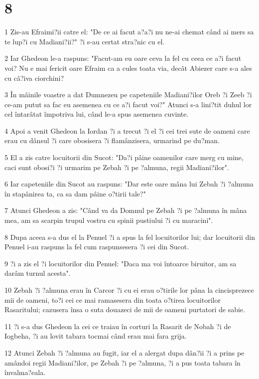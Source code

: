 \chapter{8}

\par 1 Zis-au Efraimi?ii catre el: "De ce ai facut a?a?i nu ne-ai chemat când ai mers sa te lup?i cu Madiani?ii?" ?i s-au certat stra?nic cu el.
\par 2 Iar Ghedeon le-a raspuns: "Facut-am eu oare ceva la fel cu ceea ce a?i facut voi? Nu e mai fericit oare Efraim ca a cules toata via, decât Abiezer care s-a ales cu câ?iva ciorchini?
\par 3 În mâinile voastre a dat Dumnezeu pe capeteniile Madiani?ilor Oreb ?i Zeeb ?i ce-am putut sa fac eu asemenea cu ce a?i facut voi?" Atunci s-a lini?tit duhul lor cel întarâtat împotriva lui, când le-a spus asemenea cuvinte.
\par 4 Apoi a venit Ghedeon la Iordan ?i a trecut ?i el ?i cei trei sute de oameni care erau cu dânsul ?i care obosisera ?i flamânzisera, urmarind pe du?man.
\par 5 El a zis catre locuitorii din Sucot: "Da?i pâine oamenilor care merg cu mine, caci sunt obosi?i ?i urmarim pe Zebah ?i pe ?almuna, regii Madiani?ilor".
\par 6 Iar capeteniile din Sucot au raspuns: "Dar este oare mâna lui Zebah ?i ?almuna în stapânirea ta, ca sa dam pâine o?tirii tale?"
\par 7 Atunci Ghedeon a zis: "Când va da Domnul pe Zebah ?i pe ?almuna în mâna mea, am sa scarpin trupul vostru cu spinii pustiului ?i cu maracini".
\par 8 Dupa aceea s-a dus el la Penuel ?i a spus la fel locuitorilor lui; dar locuitorii din Penuel i-au raspuns la fel cum raspunsesera ?i cei din Sucot.
\par 9 ?i a zis el ?i locuitorilor din Penuel: "Daca ma voi întoarce biruitor, am sa darâm turnul acesta".
\par 10 Zebah ?i ?almuna erau în Carcor ?i cu ei erau o?tirile lor pâna la cincisprezece mii de oameni, to?i cei ce mai ramasesera din toata o?tirea locuitorilor Rasaritului; cazusera însa o suta douazeci de mii de oameni purtatori de sabie.
\par 11 ?i s-a dus Ghedeon la cei ce traiau în corturi la Rasarit de Nobah ?i de Iogbeha, ?i au lovit tabara tocmai când erau mai fara grija.
\par 12 Atunci Zebah ?i ?almuna au fugit, iar el a alergat dupa dân?ii ?i a prins pe amândoi regii Madiani?ilor, pe Zebah ?i pe ?almuna, ?i a pus toata tabara în învalma?eala.
